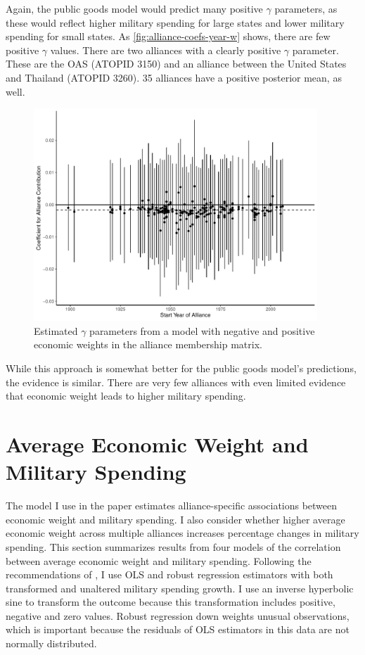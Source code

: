 \documentclass[12pt]{article}
\begin{document}
Again, the public goods model would predict many positive $\gamma$ parameters, as these would reflect higher military spending for large states and lower military spending for small states. 
As \autoref{fig:alliance-coefs-year-w} shows, there are few positive $\gamma$ values.  
There are two alliances with a clearly positive $\gamma$ parameter. 
These are the OAS (ATOPID 3150) and an alliance between the United States and Thailand (ATOPID 3260). 
35 alliances have a positive posterior mean, as well. 

\begin{figure}[htbp]
	\centering
		\includegraphics[width=0.95\textwidth]{alliance-coefs-year-w.pdf}
	\caption{Estimated $\gamma$ parameters from a model with negative and positive economic weights in the alliance membership matrix.}
	\label{fig:alliance-coefs-year-w}
\end{figure}

While this approach is somewhat better for the public goods model's predictions, the evidence is similar. 
There are very few alliances with even limited evidence that economic weight leads to higher military spending. 



\section{Average Economic Weight and Military Spending}


The model I use in the paper estimates alliance-specific associations between economic weight and military spending. 
I also consider whether higher average economic weight across multiple alliances increases percentage changes in military spending. 
This section summarizes results from four models of the correlation between average economic weight and military spending. 
Following the recommendations of \citet{RaineyBaissa2018}, I use OLS and robust regression estimators with both transformed and unaltered military spending growth.  
I use an inverse hyperbolic sine to transform the outcome because this transformation includes positive, negative and zero values. 
Robust regression down weights unusual observations, which is important because the residuals of OLS estimators in this data are not normally distributed. 
\end{document}
